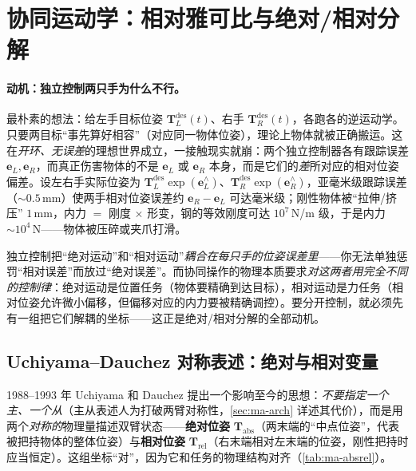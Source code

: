 \section{协同运动学：相对雅可比与绝对/相对分解}
\label{sec:ma-coopkin}

\paragraph{动机：独立控制两只手为什么不行。}
最朴素的想法：给左手目标位姿 $\mathbf{T}_L^{\text{des}}(t)$、右手 $\mathbf{T}_R^{\text{des}}(t)$，各跑各的逆运动学。只要两目标“事先算好相容”（对应同一物体位姿），理论上物体就被正确搬运。这在\emph{开环、无误差}的理想世界成立，一接触现实就崩：两个独立控制器各有跟踪误差 $\mathbf{e}_L,\mathbf{e}_R$，而真正伤害物体的不是 $\mathbf{e}_L$ 或 $\mathbf{e}_R$ 本身，而是它们的\emph{差}所对应的相对位姿偏差。设左右手实际位姿为 $\mathbf{T}_L^{\text{des}}\exp(\mathbf{e}_L^\wedge)$、$\mathbf{T}_R^{\text{des}}\exp(\mathbf{e}_R^\wedge)$，亚毫米级跟踪误差（$\sim0.5$\,mm）使两手相对位姿误差约 $\mathbf{e}_R-\mathbf{e}_L$ 可达毫米级；刚性物体被“拉伸/挤压” $1$\,mm，内力 $=$ 刚度 $\times$ 形变，钢的等效刚度可达 $10^7$\,N/m 级，于是内力 $\sim 10^4$\,N——物体被压碎或夹爪打滑。

\begin{insight}
独立控制把“绝对运动”和“相对运动”\emph{耦合在每只手的位姿误差里}——你无法单独惩罚“相对误差”而放过“绝对误差”。而协同操作的物理本质要求\emph{对这两者用完全不同的控制律}：绝对运动是位置任务（物体要精确到达目标），相对运动是力任务（相对位姿允许微小偏移，但偏移对应的内力要被精确调控）。要分开控制，就必须先有一组把它们解耦的坐标——这正是绝对/相对分解的全部动机。
\end{insight}

\subsection{Uchiyama--Dauchez 对称表述：绝对与相对变量}
\label{sec:ma-symformulation}

1988--1993 年 Uchiyama 和 Dauchez 提出一个影响至今的思想\cite{uchiyama1987symmetric,uchiyama1993symmetric}：\emph{不要指定一个主、一个从}（主从表述人为打破两臂对称性，\cref{sec:ma-arch} 详述其代价），而是用两个\emph{对称的}物理量描述双臂状态——\textbf{绝对位姿} $\mathbf{T}_{\text{abs}}$（两末端的“中点位姿”，代表被把持物体的整体位姿）与\textbf{相对位姿} $\mathbf{T}_{\text{rel}}$（右末端相对左末端的位姿，刚性把持时应当恒定）。这组坐标“对”，因为它和任务的物理结构对齐（\cref{tab:ma-absrel}）。

